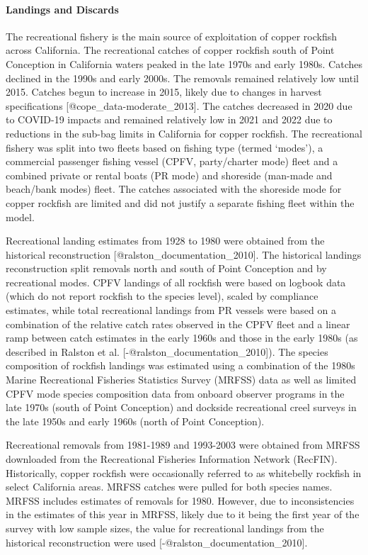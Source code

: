 \documentclass[
]{article}
\begin{document}
\hypertarget{landings-and-discards-1}{%
\paragraph{Landings and Discards}\label{landings-and-discards-1}}

\hfill\break

The recreational fishery is the main source of exploitation of copper
rockfish across California. The recreational catches of copper rockfish
south of Point Conception in California waters peaked in the late 1970s
and early 1980s. Catches declined in the 1990s and early 2000s. The
removals remained relatively low until 2015. Catches begun to increase
in 2015, likely due to changes in harvest specifications
{[}@cope\_data-moderate\_2013{]}. The catches decreased in 2020 due to
COVID-19 impacts and remained relatively low in 2021 and 2022 due to
reductions in the sub-bag limits in California for copper rockfish. The
recreational fishery was split into two fleets based on fishing type
(termed `modes'), a commercial passenger fishing vessel (CPFV,
party/charter mode) fleet and a combined private or rental boats (PR
mode) and shoreside (man-made and beach/bank modes) fleet. The catches
associated with the shoreside mode for copper rockfish are limited and
did not justify a separate fishing fleet within the model.

Recreational landing estimates from 1928 to 1980 were obtained from the
historical reconstruction {[}@ralston\_documentation\_2010{]}. The
historical landings reconstruction split removals north and south of
Point Conception and by recreational modes. CPFV landings of all
rockfish were based on logbook data (which do not report rockfish to the
species level), scaled by compliance estimates, while total recreational
landings from PR vessels were based on a combination of the relative
catch rates observed in the CPFV fleet and a linear ramp between catch
estimates in the early 1960s and those in the early 1980s (as described
in Ralston et al. {[}-@ralston\_documentation\_2010{]}). The species
composition of rockfish landings was estimated using a combination of
the 1980s Marine Recreational Fisheries Statistics Survey (MRFSS) data
as well as limited CPFV mode species composition data from onboard
observer programs in the late 1970s (south of Point Conception) and
dockside recreational creel surveys in the late 1950s and early 1960s
(north of Point Conception).

Recreational removals from 1981-1989 and 1993-2003 were obtained from
MRFSS downloaded from the Recreational Fisheries Information Network
(RecFIN). Historically, copper rockfish were occasionally referred to as
whitebelly rockfish in select California areas. MRFSS catches were
pulled for both species names. MRFSS includes estimates of removals for
1980. However, due to inconsistencies in the estimates of this year in
MRFSS, likely due to it being the first year of the survey with low
sample sizes, the value for recreational landings from the historical
reconstruction were used {[}-@ralston\_documentation\_2010{]}.
\end{document}
